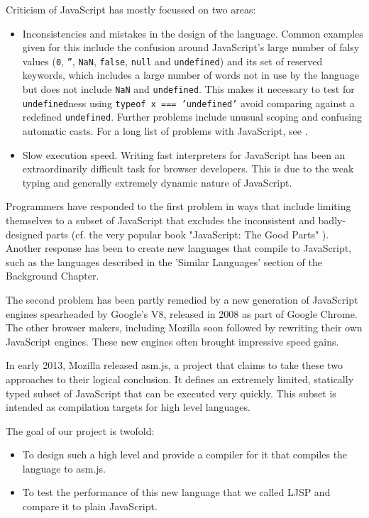 \documentclass[11pt]{report}
\begin{document}
Criticism of JavaScript has mostly focussed on two areas:
\begin{itemize}
\item Inconsistencies and mistakes in the design of the language. Common examples given for this include the confusion around JavaScript's large number of falsy values (\texttt{0},  \texttt{''}, \texttt{NaN}, \texttt{false}, \texttt{null} and \texttt{undefined}) and its set of reserved keywords, which includes a large number of words not in use by the language but does not include \texttt{NaN} and \texttt{undefined}. This makes it necessary to test for \texttt{undefined}ness using \mbox{\texttt{typeof x === 'undefined'}} avoid comparing against a redefined \texttt{undefined}. Further problems include unusual scoping and confusing automatic casts. For a long list of problems with JavaScript, see \cite{DBLP:books/daglib/0020447}.
\item Slow execution speed. Writing fast interpreters for JavaScript has been an extraordinarily difficult task for browser developers. This is due to the weak typing and generally extremely dynamic nature of JavaScript.
\end{itemize}

Programmers have responded to the first problem in ways that include limiting themselves to a subset of JavaScript that excludes the inconsistent and badly-designed parts (cf. the very popular book "JavaScript: The Good Parts" \cite{DBLP:books/daglib/0020447}). Another response has been to create new languages that compile to JavaScript, such as the languages described in the 'Similar Languages' section of the Background Chapter.

The second problem has been partly remedied by a new generation of JavaScript engines spearheaded by Google's V8, released in 2008 as part of Google Chrome. The other browser makers, including Mozilla soon followed by rewriting their own JavaScript engines. These new engines often brought impressive speed gains.

In early 2013, Mozilla released asm.js, a project that claims to take these two approaches to their logical conclusion. It defines an extremely limited, statically typed subset of JavaScript that can be executed very quickly. This subset is intended as compilation targets for high level languages.

The goal of our project is twofold:
\begin{itemize}
\item To design such a high level and provide a compiler for it that compiles the language to asm.js.
\item To test the performance of this new language that we called LJSP and compare it to plain JavaScript.
\end{itemize}
\end{document}
